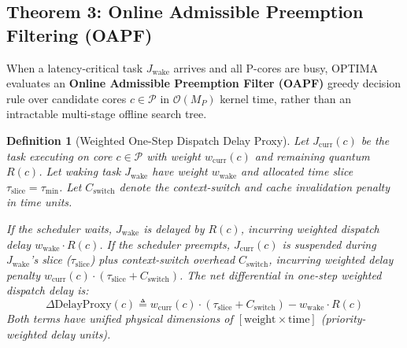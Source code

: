 \documentclass[letterpaper,twocolumn,10pt]{article}
\newtheorem{definition}{Definition}
\begin{document}
\subsection{Theorem 3: Online Admissible Preemption Filtering (OAPF)}
\label{sec:oapf_theory}
When a latency-critical task $J_{\mathrm{wake}}$ arrives and all P-cores are busy, OPTIMA evaluates an \textbf{Online Admissible Preemption Filter (OAPF)} greedy decision rule over candidate cores $c \in \mathcal{P}$ in $\mathcal{O}(M_P)$ kernel time, rather than an intractable multi-stage offline search tree.

\begin{definition}[Weighted One-Step Dispatch Delay Proxy]
\label{def:deltacost}
Let $J_{\mathrm{curr}}(c)$ be the task executing on core $c \in \mathcal{P}$ with weight $w_{\mathrm{curr}}(c)$ and remaining quantum $R(c)$. Let waking task $J_{\mathrm{wake}}$ have weight $w_{\mathrm{wake}}$ and allocated time slice $\tau_{\mathrm{slice}} = \tau_{\min}$. Let $C_{\mathrm{switch}}$ denote the context-switch and cache invalidation penalty in time units.

If the scheduler waits, $J_{\mathrm{wake}}$ is delayed by $R(c)$, incurring weighted dispatch delay $w_{\mathrm{wake}} \cdot R(c)$. If the scheduler preempts, $J_{\mathrm{curr}}(c)$ is suspended during $J_{\mathrm{wake}}$'s slice ($\tau_{\mathrm{slice}}$) plus context-switch overhead $C_{\mathrm{switch}}$, incurring weighted delay penalty $w_{\mathrm{curr}}(c) \cdot (\tau_{\mathrm{slice}} + C_{\mathrm{switch}})$. The net differential in one-step weighted dispatch delay is:
\begin{equation}
\label{eq:deltacost_paper}
\Delta\mathrm{DelayProxy}(c) \triangleq w_{\mathrm{curr}}(c) \cdot (\tau_{\mathrm{slice}} + C_{\mathrm{switch}}) - w_{\mathrm{wake}} \cdot R(c)
\end{equation}
Both terms have unified physical dimensions of $[\mathrm{weight} \times \mathrm{time}]$ (priority-weighted delay units).
\end{definition}
\end{document}
